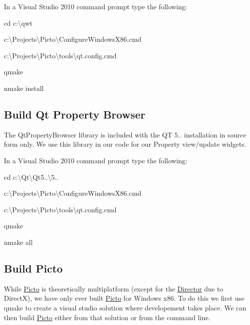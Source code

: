 \begin{DoxyEnumerate}
\item In a Visual Studio 2010 command prompt type the following\-:
\begin{DoxyEnumerate}
\item cd c\-:\textbackslash{}qwt
\item c\-:\textbackslash{}Projects\textbackslash{}\-Picto\textbackslash{}\-Configure\-Windows\-X86.\-cmd
\item c\-:\textbackslash{}Projects\textbackslash{}\-Picto\textbackslash{}tools\textbackslash{}qt.\-config.cmd
\item qmake
\item nmake install
\end{DoxyEnumerate}
\end{DoxyEnumerate}\hypertarget{build_environment_preparation_build_qt_prop_browser}{}\subsection{Build Qt Property Browser}\label{build_environment_preparation_build_qt_prop_browser}
The Qt\-Property\-Browser library is included with the Q\-T 5.. installation in source form only. We use this library in our code for our Property view/update widgets.


\begin{DoxyEnumerate}
\item In a Visual Studio 2010 command prompt type the following\-:
\begin{DoxyEnumerate}
\item cd c\-:\textbackslash{}Qt\textbackslash{}\-Qt5..\textbackslash{}5..
\item c\-:\textbackslash{}Projects\textbackslash{}\-Picto\textbackslash{}\-Configure\-Windows\-X86.\-cmd
\item c\-:\textbackslash{}Projects\textbackslash{}\-Picto\textbackslash{}tools\textbackslash{}qt.\-config.cmd
\item qmake
\item nmake all
\end{DoxyEnumerate}
\end{DoxyEnumerate}\hypertarget{build_environment_preparation_build_picto}{}\subsection{Build Picto}\label{build_environment_preparation_build_picto}
While \hyperlink{namespace_picto}{Picto} is theoretically multiplatform (except for the \hyperlink{class_director}{Director} due to Direct\-X), we have only ever built \hyperlink{namespace_picto}{Picto} for Windows x86. To do this we first use qmake to create a visual studio solution where developement takes place. We can then build \hyperlink{namespace_picto}{Picto} either from that solution or from the command line.


